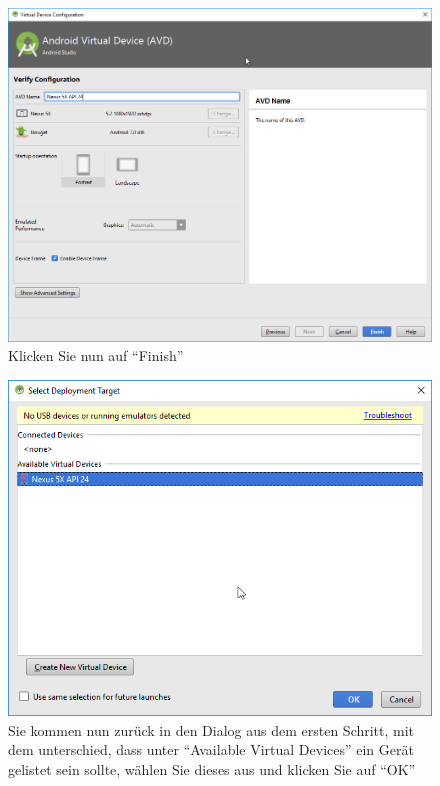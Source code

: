 \documentclass[a4paper,10pt,xetex]{article}
\begin{document}
\begin{figure}
  \centering
  \includegraphics[width=\textwidth]{Installation/3-6}
  \caption{Klicken Sie nun auf ``Finish''}
\end{figure}

\begin{figure}
  \centering
  \includegraphics[width=\textwidth]{Installation/3-7}
  \caption{Sie kommen nun zurück in den Dialog aus dem ersten Schritt, mit dem unterschied, dass unter ``Available Virtual Devices'' ein Gerät gelistet sein sollte, wählen Sie dieses aus und klicken Sie auf ``OK''}
\end{figure}
\end{document}
